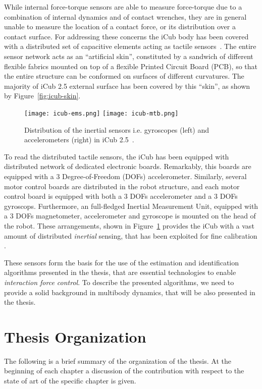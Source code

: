 While internal force-torque sensors are able to measure force-torque due to a combination of internal dynamics and of contact wrenches, they are in general unable to measure the location of a contact force, or its distribution over a contact surface. For addressing these concerns the iCub body has been covered with a distributed set of capacitive  elements  acting  as  tactile  sensors~\citep{maiolino2013}. The  entire  sensor  network  acts 
as an ``artificial skin'', constituted by a sandwich of different
flexible fabrics mounted on top of a flexible Printed Circuit
Board (PCB), so that the entire structure can be conformed
on surfaces of different curvatures. The majority of iCub 2.5 external surface has been covered by this ``skin'', as shown by Figure~\ref{fig:icub-skin}. 

\begin{figure}[H]
\centering
  \texttt{[image: icub-ems.png]}
  \texttt{[image: icub-mtb.png]}
\caption{Distribution of the inertial sensors i.e. gyroscopes (left) and accelerometers (right) in iCub 2.5~.}
\label{fig:distributedInertialSensing}
\end{figure}

To read the distributed tactile sensors, the iCub has been equipped with distributed network of dedicated electronic boards. Remarkably, this boards are equipped with a 3 Degree-of-Freedom (DOFs) accelerometer. Similarly, several motor control boards are distributed in the robot structure, and each motor control board is equipped with both a 3 DOFs accelerometer and a 3 DOFs gyroscops. Furthermore, an full-fledged Inertial Measurement Unit, equipped with a 3 DOFs magnetometer, accelerometer and gyroscope is mounted on the head of the robot. 
These arrangements, shown in Figure~\ref{fig:distributedInertialSensing} provides the iCub with a vast amount of distributed \emph{inertial} sensing, that has been exploited for fine calibration \citep{guedelha2016}.


These sensors form the basis for the use of the estimation and identification algorithms presented in the thesis, that are essential technologies to enable \emph{interaction force control}. To describe the presented algorithms, we need to provide a solid background in multibody dynamics, that will be also presented in the thesis. 

\section{Thesis Organization}
The following is a brief summary of the organization of the thesis. At the beginning of each chapter a discussion of the contribution with respect to the state of art of the specific chapter is given. 

